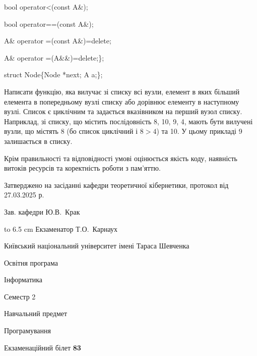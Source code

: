 \documentclass[12pt, ukrainian]{article}
\begin{document}
{\quad  bool operator<(const A\&); 

\quad  bool operator==(const A\&); 

\quad A\& operator =(const A\&)=delete; 

\quad  A\& operator =(A\&\&)=delete;\};

struct Node\{Node *next; A a;\};

 Написати функцію, яка вилучає зі списку всі вузли, елемент в яких більший елемента в попередньому вузлі списку або дорівнює елементу в наступному вузлі. Список є циклічним та задається вказівником на перший вузол списку. Наприклад, зі списку, що містить послідовність 8, 10, 9, 4, мають бути вилучені вузли, що містять 8 (бо список циклічний і $8>4$) та 10. У цьому прикладі 9 залишається в списку.

Крім правильності та відповідності умові оцінюється якість коду, наявність витоків ресурсів та коректність роботи з пам'яттю. 

}
{\smallskip\smallskip \begin {scriptsize} Затверджено на засіданні кафедри теоретичної кібернетики, протокол   від   27.03.2025 р.\par\smallskip\smallskip\smallskip\smallskip
{\parbox {6.5 cm} {Зав. кафедри \dotfill Ю.В.~Крак}}\hspace {0.7cm} {\hbox to 6.5 cm { Екзаменатор \dotfill Т.О.~Карнаух}} \end{scriptsize}}
\newpage
{{\begin {scriptsize}\par
{ \center  Київський національний університет імені Тараса Шевченка \par}
{\parbox {5 cm}{Освітня програма \hfill}{\parbox {7 cm}{Інформатика\hfill}}\parbox {6 cm}{\hfill Семестр 2}}\par
{\parbox {5 cm} {Навчальний предмет \hfill}\parbox {7 cm}{Програмування \hfill}\parbox {6cm}{\hfill}\par}\vspace{-15pt} \end{scriptsize}}{\center Екзаменаційний білет \No \textbf { 83 }\par}}
\end{document}
